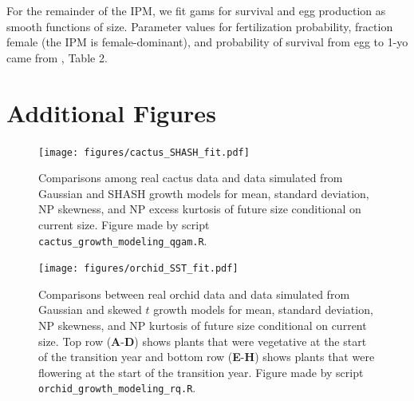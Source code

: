 \documentclass[12pt]{article}
\begin{document}
For the remainder of the IPM, we fit gams for survival and egg production as smooth functions of size. 
Parameter values for fertilization probability, fraction female (the IPM is female-dominant), and probability of survival from egg to 1-yo came from \cite{stubberud2019effects}, Table 2. 
 
\clearpage
\newpage  

\section{Additional Figures}
\label{sec:additionalFigs}
 
 \begin{figure}[tbp]
 	\centering
 	\texttt{[image: figures/cactus\_SHASH\_fit.pdf]}
 	\caption{Comparisons among real cactus data and data simulated from Gaussian and SHASH growth models for mean, standard deviation, NP skewness, and NP excess kurtosis of future size conditional on current size. Figure made by script \texttt{cactus\_growth\_modeling\_qgam.R}.}
 	\label{fig:cactus_fit}
 \end{figure} 

\begin{figure}[tbp]
	\centering
	\texttt{[image: figures/orchid\_SST\_fit.pdf]}
	\caption{Comparisons between real orchid data and data simulated from Gaussian and skewed $t$ growth models for mean, standard deviation, NP skewness, and NP kurtosis of future size conditional on current size. Top row (\textbf{A}-\textbf{D}) shows plants that were vegetative at the start of the transition year and bottom row (\textbf{E}-\textbf{H}) shows plants that were flowering at the start of the transition year. Figure made by script \texttt{orchid\_growth\_modeling\_rq.R}.}
	\label{fig:orchid_SST_fit}
\end{figure} 
\end{document}

